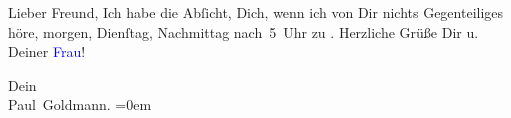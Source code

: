 \pstart
           Lieber Freund, Ich habe die Abſicht, Dich, wenn ich von
               Dir nichts Gegenteiliges höre, morgen, Dienſtag, Nachmittag nach 5 Uhr zu \label{K-L03252-2v}\label{K-L03252-2h}. Herzliche Grüße Dir u. Deiner \textcolor{blue}{Frau}{}\ledrightnote{{$\rightarrow$}\textcolor{blue}{Olga Schnitzler}}!\pend
           
\pstart
           Dein {\\[\baselineskip]}\spacefill\mbox{Paul Goldmann.}\pend
           \leftskip=0em{}\endnumbering{}  
      